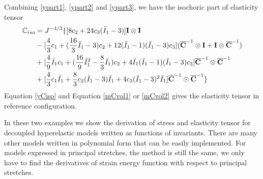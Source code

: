 Combining \ref{ypart1}, \ref{ypart2} and \ref{ypart3}, we have the isochoric part of elasticity tensor
\begin{equation} \label{yCiso}
\begin{split}
{\mathbb{C}}_{iso} &= J^{-4/3} \{
[8c_2+24c_3({\bar{I}}_1 - 3)] \bold{I} \otimes \bold{I} \\
&- [\frac{4}{3}c_1 + (\frac{16}{3}{\bar{I}}_1 - 3)c_2 + 12({\bar{I}}_1 - 1)({\bar{I}}_1 - 3)c_3]({\overline{\bold{C}}}^{-1} \otimes \bold{I} + \bold{I} \otimes {\overline{\bold{C}}}^{-1})\\
&+ [\frac{4}{9}{\bar{I}}_1c_1 + (\frac{16}{9}{{\bar{I}}_1}^2 - \frac{8}{3}{\bar{I}}_1)c_2 + 4{\bar{I}}_1({\bar{I}}_1 - 1)({\bar{I}}_1 - 3)c_3] {\overline{\bold{C}}}^{-1} \otimes {\overline{\bold{C}}}^{-1} \\
&+ [\frac{4}{3}c_1{\bar{I}}_1 + \frac{8}{3}c_2({\bar{I}}_1 - 3){\bar{I}}_1 + 4c_3({\bar{I}}_1 - 3)^2{\bar{I}}_1]{\overline{\bold{C}}}^{-1} \odot {\overline{\bold{C}}}^{-1}
\}
\end{split}
\end{equation}
Equation \ref{yCiso} and Equation \ref{mCvol1} or \ref{mCvol2} gives the elasticity tensor in reference configuration.

In these two examples we show the derivation of stress and elasticity tensor for decoupled hyperelastic models written as functions of invariants. There are many other models written in polynomial form that can be easily implemented. For models expressed in principal stretches, the method is still the same, we only have to find the derivatives of strain energy function with respect to principal stretches.

